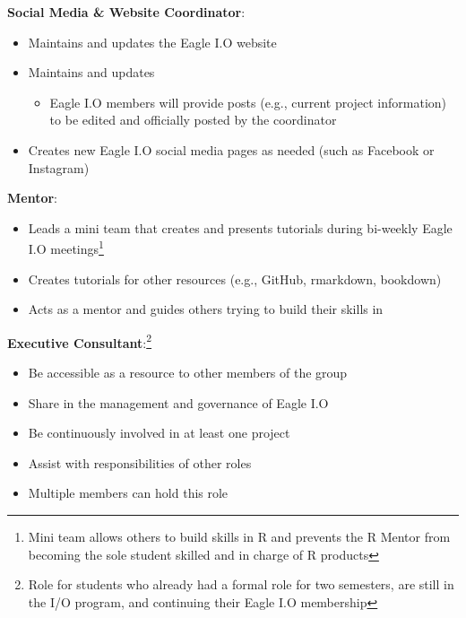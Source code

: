 \documentclass[
]{book}
\providecommand{\tightlist}{%
  \setlength{\itemsep}{0pt}\setlength{\parskip}{0pt}}
\begin{document}
\textbf{Social Media \& Website Coordinator}:

\begin{itemize}
\tightlist
\item
  Maintains and updates the Eagle I.O website
\item
  Maintains and updates \href{https://www.linkedin.com/company/eagle-i-o/}{}

  \begin{itemize}
  \tightlist
  \item
    Eagle I.O members will provide posts (e.g., current project information) to be edited and officially posted by the coordinator
  \end{itemize}
\item
  Creates new Eagle I.O social media pages as needed (such as Facebook or Instagram)
\end{itemize}

\textbf{ Mentor}:

\begin{itemize}
\tightlist
\item
  Leads a mini team that creates and presents tutorials during bi-weekly Eagle I.O meetings\footnote{Mini team allows others to build skills in R and prevents the R Mentor from becoming the sole student skilled and in charge of R products}
\item
  Creates tutorials for other resources (e.g., GitHub, rmarkdown, bookdown)\\
\item
  Acts as a mentor and guides others trying to build their skills in 
\end{itemize}

\textbf{Executive Consultant}:\footnote{Role for students who already had a formal role for two semesters, are still in the I/O program, and continuing their Eagle I.O membership}

\begin{itemize}
\tightlist
\item
  Be accessible as a resource to other members of the group
\item
  Share in the management and governance of Eagle I.O
\item
  Be continuously involved in at least one project
\item
  Assist with responsibilities of other roles\\
\item
  Multiple members can hold this role
\end{itemize}
\end{document}
